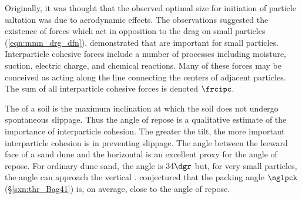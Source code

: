 \documentclass[12pt,twoside]{book}
\newcounter{reaction} %
\begin{document}
Originally, it was thought that the observed optimal size for
initiation of particle saltation was due to aerodynamic effects.
The observations suggested the existence of forces which act in
opposition to the drag on small particles (\ref{eqn:mmn_drg_dfn}). 
\cite{IvW82} demonstrated that 
are important for small particles. 
Interparticle cohesive forces include a number of processes including 
moisture, suction, electric charge, and chemical reactions.
Many of these forces may be conceived as acting along the line
connecting the centers of adjacent particles.
The sum of all interparticle cohesive forces is denoted $\frcipc$.

The  of a soil is the maximum inclination at
which the soil does not undergo spontaneous slippage. 
Thus the angle of repose is a qualitative estimate of the importance
of interparticle cohesion. 
The greater the tilt, the more important interparticle cohesion is in
preventing slippage.
The angle between the leeward face of a sand dune and the horizontal
is an excellent proxy for the angle of repose.
For ordinary dune sand, the angle is $34\dgr$ but, for very small 
particles, the angle can approach the vertical \cite[]{IvW82}.   
\cite{Bag41} conjectured that the packing angle $\nglpck$
(\S\ref{sxn:thr_Bag41}) is, on average, close to the angle of repose.
\end{document}

